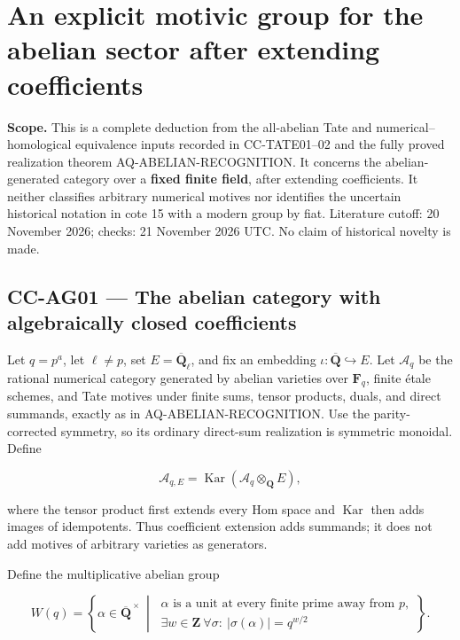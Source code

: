 \section{An explicit motivic group for the abelian sector after
extending
coefficients}\label{an-explicit-motivic-group-for-the-abelian-sector-after-extending-coefficients}

\textbf{Scope.} This is a complete deduction from the all-abelian Tate
and numerical--homological equivalence inputs recorded in CC-TATE01--02
and the fully proved realization theorem AQ-ABELIAN-RECOGNITION. It
concerns the abelian-generated category over a \textbf{fixed finite
field}, after extending coefficients. It neither classifies arbitrary
numerical motives nor identifies the uncertain historical notation in
cote 15 with a modern group by fiat. Literature cutoff: 20 November
2026; checks: 21 November 2026 UTC. No claim of historical novelty is
made.

\subsection{CC-AG01 --- The abelian category with algebraically closed
coefficients}\label{cc-ag01-the-abelian-category-with-algebraically-closed-coefficients}

Let \(q=p^a\), let \(\ell\ne p\), set \(E=\overline{\mathbf Q}_\ell\),
and fix an embedding \(\iota:\overline{\mathbf Q}\hookrightarrow E\).
Let \(\mathcal A_q\) be the rational numerical category generated by
abelian varieties over \(\mathbf F_q\), finite étale schemes, and Tate
motives under finite sums, tensor products, duals, and direct summands,
exactly as in AQ-ABELIAN-RECOGNITION. Use the parity-corrected symmetry,
so its ordinary direct-sum realization is symmetric monoidal. Define

\[
 \mathcal A_{q,E}
 =\operatorname{Kar}(\mathcal A_q\otimes_{\mathbf Q}E),
\]

where the tensor product first extends every Hom space and
\(\operatorname{Kar}\) then adds images of idempotents. Thus coefficient
extension adds summands; it does not add motives of arbitrary varieties
as generators.

Define the multiplicative abelian group

\[
 W(q)=\left\{\alpha\in\overline{\mathbf Q}^{\,\times}\ \middle|\
 \begin{array}{l}
 \alpha\text{ is a unit at every finite prime away from }p,\\
 \exists w\in\mathbf Z\ \forall\sigma:\ |\sigma(\alpha)|=q^{w/2}
 \end{array}\right\}.
\]

